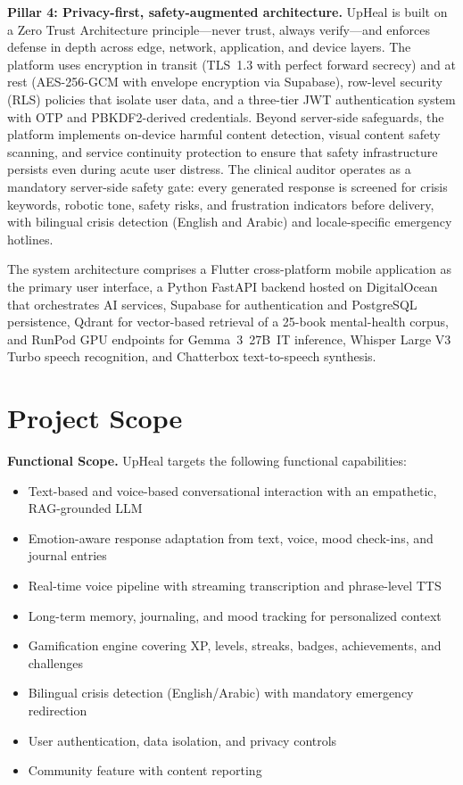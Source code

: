 \documentclass[12pt,a4paper,oneside,openany]{report}
\begin{document}
\textbf{Pillar 4: Privacy-first, safety-augmented architecture.} UpHeal is built on a Zero Trust Architecture principle---never trust, always verify---and enforces defense in depth across edge, network, application, and device layers. The platform uses encryption in transit (TLS~1.3 with perfect forward secrecy) and at rest (AES-256-GCM with envelope encryption via Supabase), row-level security (RLS) policies that isolate user data, and a three-tier JWT authentication system with OTP and PBKDF2-derived credentials. Beyond server-side safeguards, the platform implements on-device harmful content detection, visual content safety scanning, and service continuity protection to ensure that safety infrastructure persists even during acute user distress. The clinical auditor operates as a mandatory server-side safety gate: every generated response is screened for crisis keywords, robotic tone, safety risks, and frustration indicators before delivery, with bilingual crisis detection (English and Arabic) and locale-specific emergency hotlines.

The system architecture comprises a Flutter cross-platform mobile application as the primary user interface, a Python FastAPI backend hosted on DigitalOcean that orchestrates AI services, Supabase for authentication and PostgreSQL persistence, Qdrant for vector-based retrieval of a 25-book mental-health corpus, and RunPod GPU endpoints for Gemma~3~27B~IT inference, Whisper Large V3 Turbo speech recognition, and Chatterbox text-to-speech synthesis.

\section{Project Scope}
\label{sec:scope}

\textbf{Functional Scope.} UpHeal targets the following functional capabilities:
\begin{itemize}[nosep]
\item Text-based and voice-based conversational interaction with an empathetic, RAG-grounded LLM
\item Emotion-aware response adaptation from text, voice, mood check-ins, and journal entries
\item Real-time voice pipeline with streaming transcription and phrase-level TTS
\item Long-term memory, journaling, and mood tracking for personalized context
\item Gamification engine covering XP, levels, streaks, badges, achievements, and challenges
\item Bilingual crisis detection (English/Arabic) with mandatory emergency redirection
\item User authentication, data isolation, and privacy controls
\item Community feature with content reporting
\end{itemize}
\end{document}
